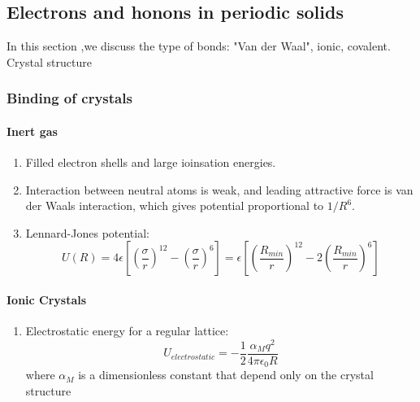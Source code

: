 \documentclass[12pt,a4paper]{article}
\begin{document}
\subsection{Electrons and honons in periodic solids}
    In this section ,we discuss the type of bonds: "Van der Waal", ionic, covalent. Crystal structure
    \subsubsection{Binding of crystals}
        \paragraph*{Inert gas}
        \begin{enumerate}
            \item Filled electron shells and large ioinsation energies.
            \item Interaction between neutral atoms is weak, and leading attractive force is van der Waals interaction, which gives potential proportional to $1/R^6$.
            \item Lennard-Jones potential:
            \begin{equation}
                U(R) = 4\epsilon[(\dfrac{\sigma}{r})^{12}-(\dfrac{\sigma}{r})^{6}] = \epsilon[(\dfrac{R_{min}}{r})^{12}-2(\dfrac{R_{min}}{r})^{6}]
            \end{equation}
        \end{enumerate}
        \paragraph*{Ionic Crystals}
            \begin{enumerate}
                \item Electrostatic energy for a regular lattice:
                \begin{equation}
                    U_{electrostatic} = -\frac{1}{2}\frac{\alpha_M q^2}{4\pi \epsilon_0 R}
                \end{equation}
                where $\alpha_M$ is a dimensionless constant that depend only on the crystal structure
            \end{enumerate}

            
        
    
\end{document}
